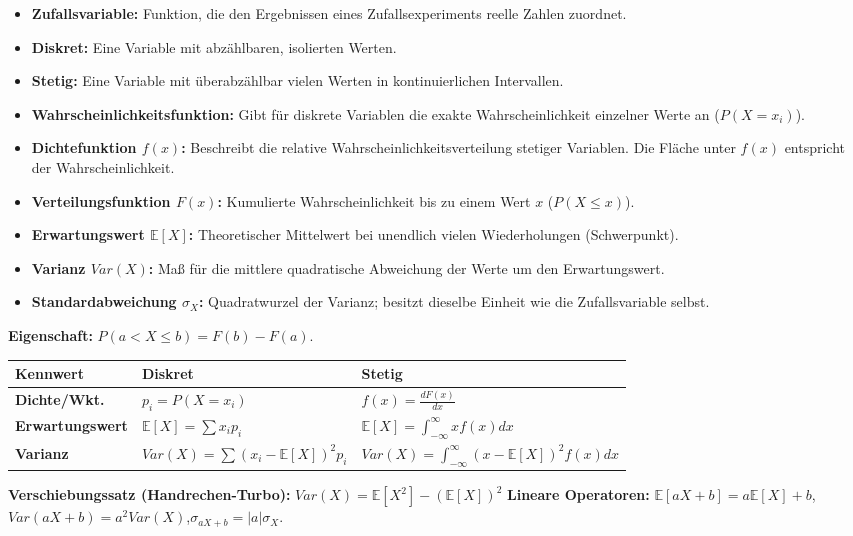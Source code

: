 \documentclass[a4paper, 9pt]{extarticle}
\begin{document}
\begin{multicols*}{2}
\begin{tcolorbox}[title={Theorie-Stichworte: Variablen \& Kennwerte}, colframe=varorange, colback=varorange!5, colbacktitle=varorange]
\begin{itemize}
    \item \textbf{Zufallsvariable:} Funktion, die den Ergebnissen eines Zufallsexperiments reelle Zahlen zuordnet.
    \item \textbf{Diskret:} Eine Variable mit abzählbaren, isolierten Werten.
    \item \textbf{Stetig:} Eine Variable mit überabzählbar vielen Werten in kontinuierlichen Intervallen.
    \item \textbf{Wahrscheinlichkeitsfunktion:} Gibt für diskrete Variablen die exakte Wahrscheinlichkeit einzelner Werte an ($P(X=x_i)$).
    \item \textbf{Dichtefunktion $f(x)$:} Beschreibt die relative Wahrscheinlichkeitsverteilung stetiger Variablen. Die Fläche unter $f(x)$ entspricht der Wahrscheinlichkeit.
    \item \textbf{Verteilungsfunktion $F(x)$:} Kumulierte Wahrscheinlichkeit bis zu einem Wert $x$ ($P(X \le x)$).
    \item \textbf{Erwartungswert $\mathbb{E}[X]$:} Theoretischer Mittelwert bei unendlich vielen Wiederholungen (Schwerpunkt).
    \item \textbf{Varianz $Var(X)$:} Maß für die mittlere quadratische Abweichung der Werte um den Erwartungswert.
    \item \textbf{Standardabweichung $\sigma_X$:} Quadratwurzel der Varianz; besitzt dieselbe Einheit wie die Zufallsvariable selbst.
\end{itemize}
\end{tcolorbox}

\begin{tcolorbox}[title={Mathematische Kennwert-Formeln}, colframe=varorange, colback=varorange!5, colbacktitle=varorange]
\textbf{Eigenschaft:} $P(a < X \le b) = F(b) - F(a)$.
\smallskip
\begin{tabularx}{\linewidth}{@{}lXX@{}}
\toprule
\textbf{Kennwert} & \textbf{Diskret} & \textbf{Stetig} \\
\midrule
\textbf{Dichte/Wkt.} & $p_i = P(X = x_i)$ & $f(x) = \frac{dF(x)}{dx}$ \\
\textbf{Erwartungswert} & $\mathbb{E}[X] = \sum x_i p_i$ & $\mathbb{E}[X] = \int_{-\infty}^{\infty} x f(x) dx$ \\
\textbf{Varianz} & $Var(X) = \sum (x_i - \mathbb{E}[X])^2 p_i$ & $Var(X) = \int_{-\infty}^{\infty} (x-\mathbb{E}[X])^2 f(x) dx$ \\
\bottomrule
\end{tabularx}
\smallskip
\textbf{Verschiebungssatz (Handrechen-Turbo):} $Var(X) = \mathbb{E}[X^2] - (\mathbb{E}[X])^2$
\smallskip
\textbf{Lineare Operatoren:} $\mathbb{E}[aX + b] = a\mathbb{E}[X] + b$,\quad $Var(aX + b) = a^2 Var(X)$,\quad $\sigma_{aX+b} = |a|\sigma_X$.
\end{tcolorbox}


\end{multicols*}
\end{document}
